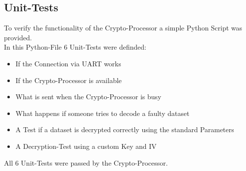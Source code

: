 \pagebreak

\subsection{Unit-Tests}

To verify the functionality of the Crypto-Processor a simple Python Script
was provided.
\\
In this Python-File 6 Unit-Tests were definded:

\begin{itemize}
	\item If the Connection via UART works
	\item If the Crypto-Processor is available
	\item What is sent when the Crypto-Processor is busy
	\item What happens if someone tries to decode a faulty dataset
	\item A Test if a dataset is decrypted correctly using the standard Parameters
	\item A Decryption-Test using a custom Key and IV
\end{itemize}

All 6 Unit-Tests were passed by the Crypto-Processor.
